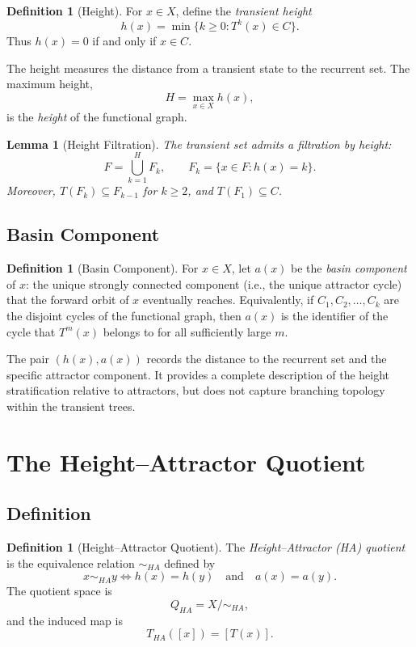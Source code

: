 \documentclass[11pt, a4paper]{article}
\newtheorem{lemma}[theorem]{Lemma}
\theoremstyle{definition}
\newtheorem{definition}[theorem]{Definition}
\theoremstyle{remark}
\begin{document}
\begin{definition}[Height]
For \(x \in X\), define the \emph{transient height}
\[
h(x) = \min\{k \ge 0 : T^k(x) \in C\}.
\]
Thus \(h(x) = 0\) if and only if \(x \in C\).
\end{definition}

The height measures the distance from a transient state to the recurrent set. The maximum height,
\[
H = \max_{x \in X} h(x),
\]
is the \emph{height} of the functional graph.

\begin{lemma}[Height Filtration]
The transient set admits a filtration by height:
\[
F = \bigcup_{k=1}^{H} F_k, \qquad F_k = \{x \in F : h(x) = k\}.
\]
Moreover, \(T(F_k) \subseteq F_{k-1}\) for \(k \ge 2\), and \(T(F_1) \subseteq C\).
\end{lemma}

\subsection{Basin Component}

\begin{definition}[Basin Component]
For \(x \in X\), let \(a(x)\) be the \emph{basin component} of \(x\):
the unique strongly connected component (i.e., the unique attractor cycle)
that the forward orbit of \(x\) eventually reaches.
Equivalently, if \(C_1, C_2, \ldots, C_k\) are the disjoint cycles of the
functional graph, then \(a(x)\) is the identifier of the cycle that
\(T^m(x)\) belongs to for all sufficiently large \(m\).
\end{definition}

The pair \((h(x), a(x))\) records the distance to the recurrent set and the specific attractor component. It provides a complete description of the height stratification relative to attractors, but does not capture branching topology within the transient trees.

\section{The Height–Attractor Quotient}

\subsection{Definition}

\begin{definition}[Height–Attractor Quotient]
The \emph{Height–Attractor (HA) quotient} is the equivalence relation \(\sim_{HA}\) defined by
\[
x \sim_{HA} y \iff h(x) = h(y) \quad \text{and} \quad a(x) = a(y).
\]
The quotient space is
\[
Q_{HA} = X / \sim_{HA},
\]
and the induced map is
\[
T_{HA}([x]) = [T(x)].
\]
\end{definition}
\end{document}
